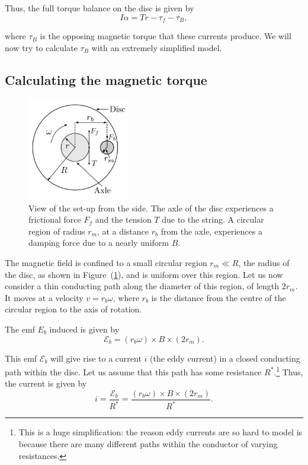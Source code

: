 Thus, the full torque balance on the disc is given by
\begin{equation}
    I \alpha = T r - \tau_f - \tau_B,
\end{equation}

where $\tau_B$ is the opposing magnetic torque that these currents produce. We will now try to calculate $\tau_B$ with an extremely simplified model.

\subsection*{Calculating the magnetic torque}

\begin{figure}[!htb]
    \centering
    \includegraphics[width=0.4\textwidth]{figs/em-damping/emdamping-forces.png}
    \caption{View of the set-up from the side. The axle of the disc experiences a frictional force $F_f$ and the tension $T$ due to the string. A circular region of radius $r_m$, at a distance $r_b$ from the axle, experiences a damping force due to a nearly uniform $B$.}
    \label{fig:emdamping-forces}
\end{figure}

The magnetic field is confined to a small circular region $r_m \ll R$, the radius of the disc, as shown in Figure~(\ref{fig:emdamping-forces}), and is uniform over this region. Let us now consider a thin conducting path along the diameter of this region, of length $2 r_m$. It moves at a velocity $v = r_b \omega$, where $r_b$ is the distance from the centre of the circular region to the axis of rotation.

The emf $E_b$ induced is given by
\begin{equation}
    \mathcal{E}_b = (r_b \omega)\times B \times (2r_m).
\end{equation}

This emf $\mathcal{E}_b$ will give rise to a current $i$ (the eddy current) in a closed conducting path within the disc. Let us assume that this path has some resistance $R^*$.\footnote{This is a huge simplification: the reason eddy currents are so hard to model is because there are many different paths within the conductor of varying resistances.} Thus, the current is given by
\begin{equation}
    i = \frac{\mathcal{E}_b}{R^*} = \frac{(r_b \omega)\times B \times (2r_m)}{R^*}.
\end{equation}

